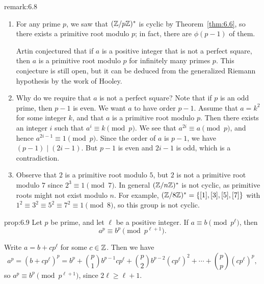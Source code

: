 \begin{remark}{remark:6.8}
    \begin{enumerate}[(1)]
        \item For any prime $p$, we saw that $(\mathbb{Z}/p\mathbb{Z})^*$ is cyclic by 
              Theorem~\ref{thm:6.6}, so there exists a primitive root modulo $p$; 
              in fact, there are $\phi(p-1)$ of them. 

              Artin conjectured that if $a$ is a positive integer that is not 
              a perfect square, then $a$ is a primitive root modulo $p$ for 
              infinitely many primes $p$. This conjecture is still open, but 
              it can be deduced from the generalized Riemann hypothesis by 
              the work of Hooley. 
        \item Why do we require that $a$ is not a perfect square? Note that if 
              $p$ is an odd prime, then $p-1$ is even. We want $a$ to have order 
              $p-1$. Assume that $a = k^2$ for some integer $k$, and that 
              $a$ is a primitive root modulo $p$. Then there exists an integer 
              $i$ such that $a^i \equiv k \pmod p$. We see that $a^{2i} \equiv a 
              \pmod p$, and hence $a^{2i-1} \equiv 1 \pmod p$. Since the 
              order of $a$ is $p-1$, we have $(p-1) \mid (2i-1)$. But 
              $p-1$ is even and $2i-1$ is odd, which is a contradiction. 
        \item Observe that $2$ is a primitive root modulo $5$, but $2$ is not 
              a primitive root modulo $7$ since $2^3 \equiv 1 \pmod 7$. In 
              general $(\mathbb{Z}/n\mathbb{Z})^*$ is not cyclic, as primitive roots might not 
              exist modulo $n$. For example, $(\mathbb{Z}/8\mathbb{Z})^* = \{[1], [3], [5], [7]\}$ 
              with $1^2 \equiv 3^2 \equiv 5^2 \equiv 7^2 \equiv 1 \pmod 8$, 
              so this group is not cyclic. 
    \end{enumerate}
\end{remark}

\begin{prop}{prop:6.9}
    Let $p$ be prime, and let $\ell$ be a positive integer. If $a \equiv b 
    \pmod{p^\ell}$, then 
    \[ a^p \equiv b^p \pmod{p^{\ell+1}}. \] 
\end{prop}
\begin{pf}
    Write $a = b + cp^\ell$ for some $c \in \mathbb{Z}$. Then we have 
    \[ a^p = (b + cp^\ell)^p = b^p + \binom{p}{1} b^{p-1} cp^\ell + 
    \binom{p}{2} b^{p-2} (cp^\ell)^2 + \cdots + \binom{p}{p} (cp^\ell)^p, \] 
    so $a^p \equiv b^p \pmod{p^{\ell+1}}$, since $2\ell \geq \ell+1$. 
\end{pf}

